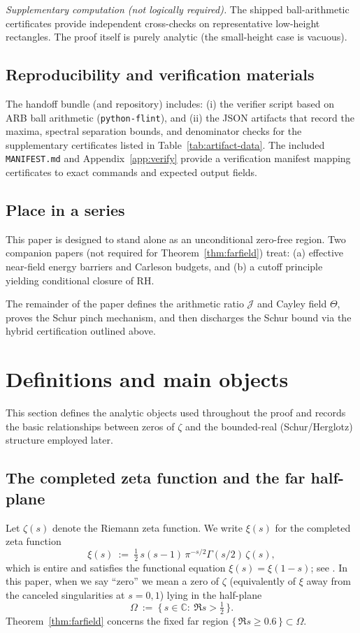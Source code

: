 \documentclass[11pt]{amsart}
\theoremstyle{definition}
\theoremstyle{remark}
\newcommand{\C}{\mathbb{C}}
\begin{document}
\medskip
\noindent\emph{Supplementary computation (not logically required).}
The shipped ball-arithmetic certificates provide independent cross-checks
on representative low-height rectangles.
The proof itself is purely analytic (the small-height case is vacuous).

\subsection*{Reproducibility and verification materials}
The handoff bundle (and repository) includes:
(i) the verifier script based on ARB ball arithmetic (\texttt{python-flint}), and
(ii) the JSON artifacts that record the  maxima, spectral separation bounds, and denominator checks for the supplementary certificates listed in Table~\ref{tab:artifact-data}.
The included \texttt{MANIFEST.md} and Appendix~\ref{app:verify} provide a verification manifest mapping certificates to exact commands and expected output fields.

\subsection*{Place in a series}
This paper is designed to stand alone as an unconditional  zero-free region.
Two companion papers (not required for Theorem~\ref{thm:farfield}) treat: (a) effective near-field energy barriers and Carleson budgets, and (b) a cutoff principle yielding conditional closure of RH.

\medskip
\noindent The remainder of the paper defines the arithmetic ratio $\mathcal J$ and Cayley field $\Theta$, proves the Schur pinch mechanism, and then discharges the Schur bound via the hybrid certification outlined above.

\section{Definitions and main objects}\label{sec:defs}

This section defines the analytic objects used throughout the proof and records the basic relationships
between zeros of $\zeta$ and the bounded-real (Schur/Herglotz) structure employed later.
\subsection*{The completed zeta function and the far half-plane}
Let $\zeta(s)$ denote the Riemann zeta function.
We write $\xi(s)$ for the completed zeta function
\[
  \xi(s)\ :=\ \tfrac12\,s(s-1)\,\pi^{-s/2}\Gamma(s/2)\,\zeta(s),
\]
which is entire and satisfies the functional equation $\xi(s)=\xi(1-s)$; see \cite{Titchmarsh}.
In this paper, when we say ``zero'' we mean a zero of $\zeta$ (equivalently of $\xi$ away from the
canceled singularities at $s=0,1$) lying in the half-plane
\[
  \Omega\ :=\ \{\,s\in\C:\ \Re s>\tfrac12\,\}.
\]
Theorem~\ref{thm:farfield} concerns the fixed far region $\{\,\Re s\ge 0.6\,\}\subset\Omega$.
\end{document}
